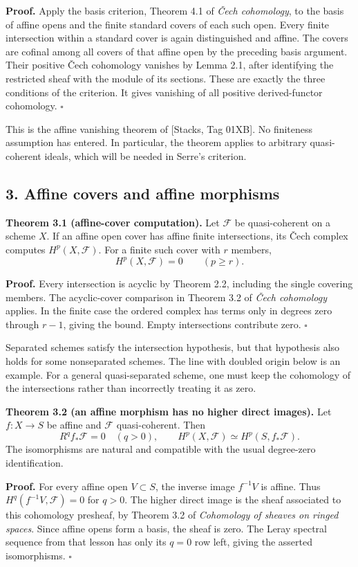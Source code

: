 \documentclass[11pt]{article}
\begin{document}
\textbf{Proof.} Apply the basis criterion, Theorem 4.1 of \emph{Čech
cohomology}, to the basis of affine opens and the finite standard covers
of each such open. Every finite intersection within a standard cover is
again distinguished and affine. The covers are cofinal among all covers
of that affine open by the preceding basis argument. Their positive Čech
cohomology vanishes by Lemma 2.1, after identifying the restricted sheaf
with the module of its sections. These are exactly the three conditions
of the criterion. It gives vanishing of all positive derived-functor
cohomology. \(\square\)

This is the affine vanishing theorem of {[}Stacks, Tag 01XB{]}. No
finiteness assumption has entered. In particular, the theorem applies to
arbitrary quasi-coherent ideals, which will be needed in Serre's
criterion.

\subsection{3. Affine covers and affine
morphisms}\label{affine-covers-and-affine-morphisms}

\textbf{Theorem 3.1 (affine-cover computation).} Let \(\mathcal F\) be
quasi-coherent on a scheme \(X\). If an affine open cover has affine
finite intersections, its Čech complex computes \(H^p(X,\mathcal F)\).
For a finite such cover with \(r\) members, \[
H^p(X,\mathcal F)=0\qquad(p\ge r).
\]

\textbf{Proof.} Every intersection is acyclic by Theorem 2.2, including
the single covering members. The acyclic-cover comparison in Theorem 3.2
of \emph{Čech cohomology} applies. In the finite case the ordered
complex has terms only in degrees zero through \(r-1\), giving the
bound. Empty intersections contribute zero. \(\square\)

Separated schemes satisfy the intersection hypothesis, but that
hypothesis also holds for some nonseparated schemes. The line with
doubled origin below is an example. For a general quasi-separated
scheme, one must keep the cohomology of the intersections rather than
incorrectly treating it as zero.

\textbf{Theorem 3.2 (an affine morphism has no higher direct images).}
Let \(f:X\to S\) be affine and \(\mathcal F\) quasi-coherent. Then \[
R^qf_*\mathcal F=0\quad(q>0),\qquad
H^p(X,\mathcal F)\simeq H^p(S,f_*\mathcal F).
\] The isomorphisms are natural and compatible with the usual
degree-zero identification.

\textbf{Proof.} For every affine open \(V\subset S\), the inverse image
\(f^{-1}V\) is affine. Thus \(H^q(f^{-1}V,\mathcal F)=0\) for \(q>0\).
The higher direct image is the sheaf associated to this cohomology
presheaf, by Theorem 3.2 of \emph{Cohomology of sheaves on ringed
spaces}. Since affine opens form a basis, the sheaf is zero. The Leray
spectral sequence from that lesson has only its \(q=0\) row left, giving
the asserted isomorphisms. \(\square\)
\end{document}
